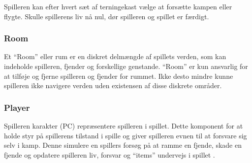 Spilleren kan efter hvert sæt af terningekast vælge at forsætte kampen eller
flygte. Skulle spillerens liv nå nul, dør spilleren og spillet er færdigt.

\subsubsection{Room}
Et ``Room'' eller rum er en diskret delmængde af spillets verden, som kan indeholde
spilleren, fjender og forskellige genstande. ``Room'' er kun ansvarlig for at tilføje
og fjerne spilleren og fjender for rummet. Ikke desto mindre kunne spilleren ikke
navigere verden uden existensen af disse diskrete områder.

\subsubsection{Player}
Spilleren karakter (PC) repræsentere spilleren i spillet. Dette komponent for at
holde styr på spillerens tilstand i spille og giver spilleren evnen til at forsvare
sig selv i kamp. Denne simulere en spillers forsøg på at ramme en fjende, skade en 
fjende og opdatere spilleren liv, forsvar og ``items'' undervejs i spillet 
\parencite[Section 13.3.2][]{TekniskBilag}.


\newpage
